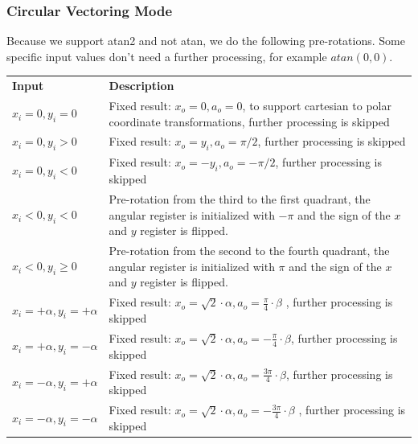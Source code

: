 \documentclass[a4paper, 12pt, notitlepage]{report}
\begin{document}
      \subsubsection{Circular Vectoring Mode}
      Because we support atan2 and not atan, we do the following pre-rotations. 
      Some specific input values don't need a further processing, for 
      example $atan( 0, 0 )$.\newline\newline
         \begin{tabular}{@{}lp{380pt}@{}}
            \rowcolor{tableheadcolor}\textbf{Input} &\textbf{ Description }  \\

            $x_i = 0, y_i = 0$    &    Fixed result: $x_o =  0, a_o = 0$,   
            to support cartesian to polar coordinate transformations, 
            further processing is skipped  \\ \midrule

            $x_i = 0, y_i > 0 $   &    Fixed result: $x_o =  y_i, a_o = \pi/2$,  
            further processing is skipped \\ \midrule

            $x_i = 0, y_i < 0 $   &    Fixed result: $x_o = -y_i, a_o = -\pi/2$,  
            further processing is skipped \\ \midrule


            $x_i < 0, y_i < 0 $   &    Pre-rotation from the third to the first quadrant,
                                       the angular register is initialized with $-\pi$ and
                                       the sign of the $x$ and $y$ register is flipped. \\ \midrule

            $x_i < 0, y_i \ge 0 $   &    Pre-rotation from the second to the fourth quadrant,
                                       the angular register is initialized with $\pi$ and
                                       the sign of the $x$ and $y$ register is flipped. \\ \midrule


            $x_i = + \alpha, y_i = + \alpha $   &  Fixed result: $x_o = \sqrt{2} \cdot \alpha, a_o = \frac{\pi}{4} \cdot \beta$ ,
            further processing is skipped \\ \midrule

            $x_i = + \alpha, y_i = - \alpha $   &  Fixed result: $x_o = \sqrt{2} \cdot \alpha, a_o = - \frac{\pi}{4} \cdot \beta$, 
            further processing is skipped \\ \midrule

            $x_i = - \alpha, y_i = + \alpha $   &  Fixed result: $x_o = \sqrt{2} \cdot \alpha, a_o =  \frac{3 \pi}{4} \cdot \beta$, 
            further processing is skipped \\ \midrule

            $x_i = - \alpha, y_i = - \alpha $   &  Fixed result: $x_o = \sqrt{2} \cdot \alpha, a_o = - \frac{3 \pi }{4} \cdot \beta$ ,
            further processing is skipped \\ 
            \bottomrule
         \end{tabular}
\end{document}
